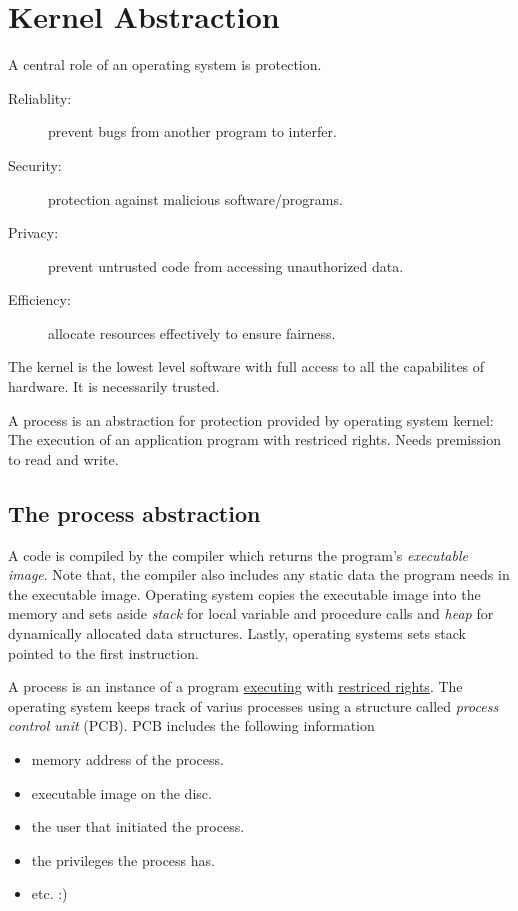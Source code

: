 \chapter{Kernel Abstraction}
A central role of an operating system is protection.
\begin{description}
    \item [Reliablity:] prevent bugs from another program to interfer.
    \item [Security:] protection against malicious software/programs.
    \item [Privacy:] prevent untrusted code from accessing unauthorized data.
    \item [Efficiency:] allocate resources effectively to ensure fairness.
\end{description}
The kernel is the lowest level software with full access to all the capabilites of hardware. It is necessarily trusted.

A process is an abstraction for protection provided by operating system kernel: The execution of an application program with restriced rights. Needs premission to read and write.
\section{The process abstraction}
A code is compiled by the compiler which returns the program's \textit{executable image}. Note that, the compiler also includes any static data the program needs in the executable image. Operating system copies the executable image into the memory and sets aside \textit{stack} for local variable and procedure calls and \textit{heap} for dynamically allocated data structures. Lastly, operating systems sets stack pointed to the first instruction.

A process is an instance of a program \underline{executing} with \underline{restriced rights}. The operating system keeps track of varius processes using a structure called \textit{process control unit} (PCB). PCB includes the following information
\begin{itemize}
    \item memory address of the process.
    \item executable image on the disc.
    \item the user that initiated the process.
    \item the privileges the process has.
    \item etc. :)
\end{itemize}


